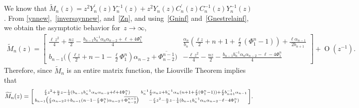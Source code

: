 \documentclass[12pt]{amsart}
\newtheorem{proposition}{Proposition}[section]
\newcommand{\dde}{\operatorname e}
\begin{document}
%
We know that \( \widetilde{M}_n(z)=z^2Y_n^\prime(z)Y_n^{-1}(z)+z^2Y_n(z)C_n^\prime(z)C_n^{-1}(z)Y_n^{-1}(z) \).
 From \eqref{ynnew},~\eqref{inversaynnew}, and~\eqref{Zn}, and using~\eqref{Gninf} and~\eqref{Gnestrelainf}, we obtain the asymptotic behavior for~\( z\to\infty \),
{\small
\begin{align*}
 \widetilde{M}_n(z)
 =
\begin{bmatrix}
\frac{\ell \, z^2}{4}+\frac{n z}{2}-\frac{b_{n-1}b_n^{-1}\alpha_n\alpha_{n-2}+ \ell +4\Phi_1^n}{4} & 
\frac{\alpha_n}{b_{n}} ( \frac{\ell z}{2}+n+1+\frac{ \ell }{2}(\Phi_1^n-1))+\frac{ \ell \alpha_{n-1}}{2b_{n+1}}\\
b_{n-1}\big( ( \frac{\ell z}{2} + n-1-\frac{ \ell }{2}\Phi_1^n)\alpha_{n-2}+\overline{\Phi_{n-2}^{n-1}} \big) & 
-\frac{\ell \, z^2}{4}-\frac{n z}{2}-\frac{b_{n-1}b_n^{-1}\alpha_n\alpha_{n-2}- \ell -4\Phi_1^n}{4} 
\end{bmatrix}
+ \operatorname{O}(z^{-1}) .
\end{align*}
}
{\hspace{-.075cm}}Therefore, since \( \widetilde{M}_n \) is an entire matrix function, the Liouville Theorem implies that
\begin{align}\label{segundaparteMntilde}
 \widetilde{M}_n(z)=
 \begin{bsmallmatrix}
\frac{ \ell }{4}z^2+\frac{n}{2}z-\frac{1}{4}(b_{n-1}b_n^{-1}\alpha_n\alpha_{n-2}+\ell +4\Phi_1^n) 
& 
b_{n}^{-1}\frac{ \ell }{2}\alpha_n z+b_{n}^{-1}\alpha_n ( n+1+\frac{ \ell }{2}(\Phi_1^n -1) ) +\frac{ \ell }{2}b_{n+1}^{-1}\alpha_{n-1}
 \\
b_{n-1}\big( \frac{ \ell }{2}\alpha_{n-2}z+b_{n-1} ( n-1-\frac{ \ell }{2}\Phi_1^n)\alpha_{n-2}+\overline{\Phi_{n-2}^{n-1}} \big) 
&
 -\frac{ \ell }{4}z^2-\frac{n}{2}z-\frac{1}{4}(b_{n-1}b_n^{-1}\alpha_n\alpha_{n-2}- \ell -4\Phi_1^n) 
\end{bsmallmatrix} 
 .
\end{align}
\end{document}
